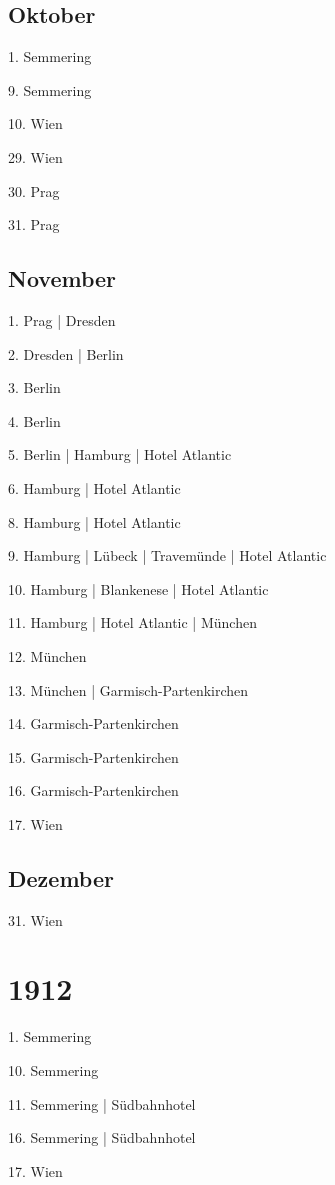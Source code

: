 \documentclass[twoside=false,titlepage=false,open=any, parskip=never, fontsize=10pt, headings=small, chapterprefix=false, appendixprefix=false, DIV=15]{scrbook}
\begin{document}
\begin{multicols}{3}
            \section*{Oktober}
            1. Semmering\par
            9. Semmering\par
            10. Wien\par
            29. Wien\par
            30. Prag\par
            31. Prag\par
            \section*{November}
            1. Prag | Dresden\par
            2. Dresden | Berlin\par
            3. Berlin\par
            4. Berlin\par
            5. Berlin | Hamburg | Hotel Atlantic\par
            6. Hamburg | Hotel Atlantic\par
            8. Hamburg | Hotel Atlantic\par
            9. Hamburg | Lübeck | Travemünde | Hotel Atlantic\par
            10. Hamburg | Blankenese | Hotel Atlantic\par
            11. Hamburg | Hotel Atlantic | München\par
            12. München\par
            13. München | Garmisch-Partenkirchen\par
            14. Garmisch-Partenkirchen\par
            15. Garmisch-Partenkirchen\par
            16. Garmisch-Partenkirchen\par
            17. Wien\par
            \section*{Dezember}
            31. Wien\par
            \chapter*{1912}
            1. Semmering\par
            10. Semmering\par
            11. Semmering | Südbahnhotel\par
            16. Semmering | Südbahnhotel\par
            17. Wien\par

\end{multicols}
\end{document}
